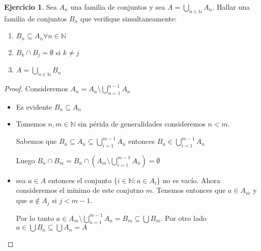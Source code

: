 \documentclass[12pt]{article}
\newcommand{\N}{\mathbb{N}}
\theoremstyle{definition}
\newtheorem{ej}{Ejercicio}
\begin{document}
\begin{ej}
	Sea $A_n$ una familia de conjuntos y sea $A = \bigcup_{n \in\N}A_n$. Hallar una familia de conjuntos $B_n$ que verifique simultaneamente:
	\begin{enumerate}
		\item $B_n \subseteq A_n \forall n \in \N$
		\item $B_k \cap B_j = \emptyset$ si $k \neq j$
		\item $A = \bigcup_{n\in\N} B_n$
	\end{enumerate}
	\begin{proof}
	Consideremos $A_n = A_n \setminus \bigcup_{n = 1}^{n-1} A_n$

	\begin{itemize}
		\item Es evidente $B_n \subseteq A_n$
		\item Tomemos $n,m \in \N$ sin périda de generalidades consideremos $n < m$. 

			Sabemos que $B_n \subseteq A_n \subseteq \bigcup_{i =1}^{m-1} A_n$ entonces $B_n \in \bigcup_{i = 1}^{m-1}A_n$
	
			Luego $B_n \cap B_m = B_n \cap ( A_m \setminus \bigcup_{i=1}^{m-1} A_n) =\emptyset$

		\item sea $a \in A$ entonces el conjunto $\{ i \in \N :a \in A_i \}$ no es vacío. Ahora consideremos el minimo de este conjutno $m$. Tenemos entonces que $a \in A_m$ y que $a \notin A_j$ si $j < m-1$. 

			Por lo tanto $a \in A_m \setminus \bigcup_{n=1}^{m-1}A_n = B_m \subseteq \bigcup B_m$. Por otro lado $a \in \bigcup B_n \subseteq \bigcup A_n = A$
	\end{itemize}

\end{proof}
\end{ej}
\end{document}
